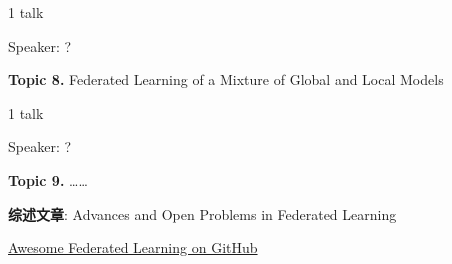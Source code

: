 1 talk

Speaker: ?

\vspace{2em}

{\bfseries \large Topic 8.} Federated Learning of a Mixture of Global and Local Models \cite{hanzely2020federated}

1 talk

Speaker: ?

\vspace{2em}

{\bfseries \large Topic 9.} \ldots\ldots


\vspace{3em}


{\bfseries \Large 综述文章}: Advances and Open Problems in Federated Learning \cite{kairouz2019advances_fl}

\vspace{2em}

\href{https://github.com/chaoyanghe/Awesome-Federated-Learning}{Awesome Federated Learning on GitHub}




